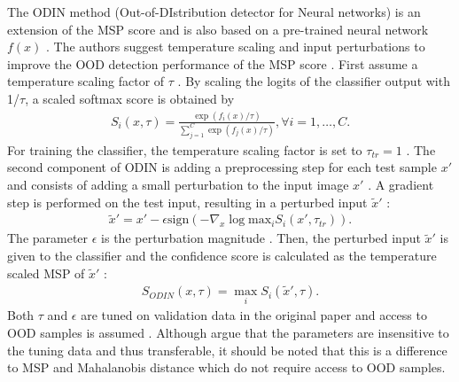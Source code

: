 \par
The ODIN method (Out-of-DIstribution detector for Neural networks) is an extension of the MSP score and is also based on a pre-trained neural network $f(x)$ \citep{Liang2018}.
The authors suggest temperature scaling and input perturbations to improve the OOD detection performance of the MSP score \citep{Liang2018}.
First assume a temperature scaling factor of $\tau$ \citep{Liang2018}.
By scaling the logits of the classifier output with 1/$\tau$, a scaled softmax score is obtained by \citep{Liang2018}
\begin{align}
	S_i(x,\tau) = \frac{\exp(f_i(x)/\tau)}{\sum_{j=1}^{C}\exp(f_j(x)/\tau)}, \forall i=1,\dots,C.
\end{align}
For training the classifier, the temperature scaling factor is set to $\tau_{tr}=1$ \citep{Liang2018}.
The second component of ODIN is adding a preprocessing step for each test sample $x'$ and consists of adding a small perturbation to the input image $x'$ \citep{Liang2018}.
A gradient step is performed on the test input, resulting in a perturbed input $\tilde{x}'$ \citep{Liang2018}: 
\begin{align}
	\tilde{x}' = x' - \epsilon \text{sign}(-\nabla_x \log \text{max}_i  S_i(x',\tau_{tr})).
\end{align}
The parameter $\epsilon$ is the perturbation magnitude \citep{Liang2018}.
Then, the perturbed input $\tilde{x}'$ is given to the classifier and the confidence score is calculated as the temperature scaled MSP of $\tilde{x}'$ \citep{Liang2018}:
\begin{align}
	S_{ODIN}(x,\tau) = \max_i S_i(\tilde{x}',\tau).
\end{align}
Both $\tau$ and $\epsilon$ are tuned on validation data in the original paper and access to OOD samples is assumed \citep{Liang2018,Hsu2020}.
Although \citep{Liang2018} argue that the parameters are insensitive to the tuning data and thus transferable, it should be noted that this is a difference to MSP and Mahalanobis distance which do not require access to OOD samples.
